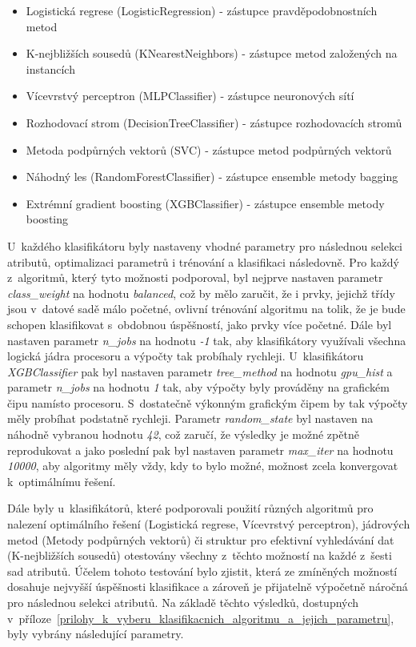 \begin{itemize}
    \item Logistická regrese (LogisticRegression) - zástupce pravděpodobnostních metod
    \item K-nejbližších sousedů (KNearestNeighbors) - zástupce metod založených na instancích
    \item Vícevrstvý perceptron (MLPClassifier) - zástupce neuronových sítí
    \item Rozhodovací strom (DecisionTreeClassifier) - zástupce rozhodovacích stromů
    \item Metoda podpůrných vektorů (SVC) - zástupce metod podpůrných vektorů
    \item Náhodný les (RandomForestClassifier) - zástupce ensemble metody bagging
    \item Extrémní gradient boosting (XGBClassifier) - zástupce ensemble metody boosting 
\end{itemize}

U~každého klasifikátoru byly nastaveny vhodné parametry pro následnou selekci atributů, optimalizaci parametrů i trénování a klasifikaci následovně. Pro každý z~algoritmů, který tyto možnosti podporoval, byl nejprve nastaven parametr \textit{class\_weight} na hodnotu \textit{balanced}, což by mělo zaručit, že i prvky, jejichž třídy jsou v~datové sadě málo početné, ovlivní trénování algoritmu na tolik, že je bude schopen klasifikovat s~obdobnou úspěšností, jako prvky více početné. Dále byl nastaven parametr \textit{n\_jobs} na hodnotu \textit{-1} tak, aby klasifikátory využívali všechna logická jádra procesoru a výpočty tak probíhaly rychleji. U~klasifikátoru \textit{XGBClassifier} pak byl nastaven parametr \textit{tree\_method} na hodnotu \textit{gpu\_hist} a parametr \textit{n\_jobs} na hodnotu \textit{1} tak, aby výpočty byly prováděny na grafickém čipu namísto procesoru. S~dostatečně výkonným grafickým čipem by tak výpočty měly probíhat podstatně rychleji. Parametr \textit{random\_state} byl nastaven na náhodně vybranou hodnotu \textit{42}, což zaručí, že výsledky je možné zpětně reprodukovat a jako poslední pak byl nastaven parametr \textit{max\_iter} na hodnotu \textit{10000}, aby algoritmy měly vždy, kdy to bylo možné, možnost zcela konvergovat k~optimálnímu řešení.

Dále byly u~klasifikátorů, které podporovali použití různých algoritmů pro nalezení optimálního řešení (Logistická regrese, Vícevrstvý perceptron), jádrových metod (Metody podpůrných vektorů) či struktur pro efektivní vyhledávání dat (K-nejbližších sousedů) otestovány všechny z~těchto možností na každé z~šesti sad atributů. Účelem tohoto testování bylo zjistit, která ze zmíněných možností dosahuje nejvyšší úspěšnosti klasifikace a zároveň je přijatelně výpočetně náročná pro následnou selekci atributů. Na základě těchto výsledků, dostupných v~příloze~\ref{prilohy_k_vyberu_klasifikacnich_algoritmu_a_jejich_parametru}, byly vybrány následující parametry.


